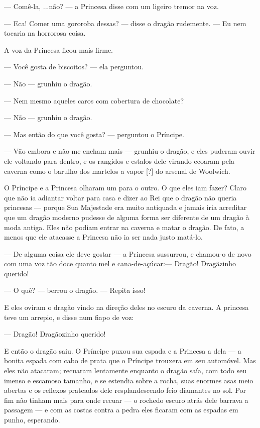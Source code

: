 — Comê-la, ...não? — a Princesa disse com um ligeiro tremor na voz. 

— Eca! Comer uma gororoba dessas? — disse o dragão rudemente. — Eu nem
tocaria na horrorosa coisa. 

A voz da Princesa ficou mais firme.

— Você gosta de biscoitos? — ela perguntou.

— Não — grunhiu o dragão.

— Nem mesmo aqueles caros com cobertura de chocolate?

— Não — grunhiu o dragão.

— Mas então do que você gosta? — perguntou o Príncipe. 

— Vão embora e não me encham mais — grunhiu o dragão, e eles puderam
ouvir ele voltando para dentro, e os rangidos e estalos dele virando
ecoaram pela caverna como o barulho dos martelos a vapor [?] do
arsenal de Woolwich.

O Príncipe e a Princesa olharam um para o outro. O que eles iam fazer?
Claro que não ia adiantar voltar para casa e dizer ao Rei que o
dragão não queria princesas — porque Sua Majestade era muito
antiquada e jamais iria acreditar que um dragão moderno pudesse de
alguma forma ser diferente de um dragão à moda antiga. Eles não
podiam entrar na caverna e matar o dragão. De fato, a menos que ele
atacasse a Princesa não ia ser nada justo matá-lo.

— De alguma coisa ele deve gostar — a Princesa sussurrou, e chamou-o
de novo com uma voz tão doce quanto mel e cana-de-açúcar:— Dragão!
Dragãzinho querido!

— O quê? — berrou o dragão. — Repita isso!

E eles oviram o dragão vindo na direção deles no escuro da caverna. A
princesa teve um arrepio, e disse num fiapo de voz:

— Dragão! Dragãozinho querido!

E então o dragão saiu. O Príncipe puxou sua espada e a Princesa a dela
— a bonita espada com cabo de prata que o Príncipe trouxera em seu
automóvel. Mas eles não atacaram; recuaram lentamente enquanto o
dragão saía, com todo seu imenso e escamoso tamanho, e se estendia
sobre a rocha, suas enormes asas meio abertas e os reflexos prateados
dele resplandescendo feio diamantes no sol. Por fim não tinham mais
para onde recuar — o rochedo escuro atrás dele barrava a passagem — e
com as costas contra a pedra eles ficaram com as espadas em punho,
esperando.

